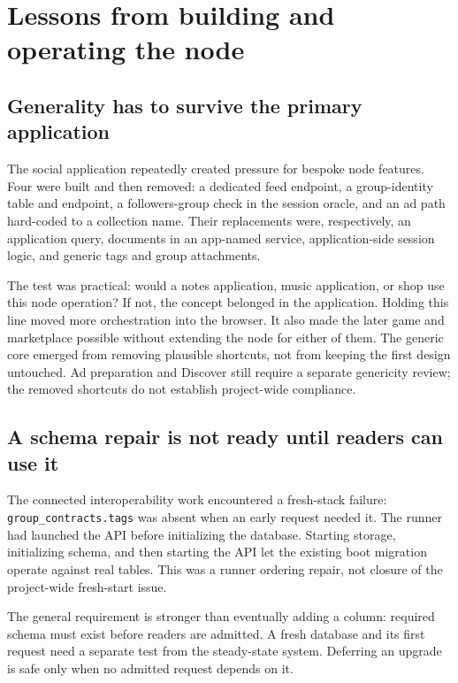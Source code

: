 \documentclass[sigconf, nonacm]{acmart}
\begin{document}
\section{Lessons from building and operating the node}
\label{sec:lessons}

\subsection{Generality has to survive the primary application}

The social application repeatedly created pressure for bespoke node
features. Four were built and then removed: a dedicated feed endpoint,
a group-identity table and endpoint, a followers-group check in the
session oracle, and an ad path hard-coded to a collection name. Their
replacements were, respectively, an application query, documents in an
app-named service, application-side session logic, and generic tags and
group attachments.

The test was practical: would a notes application, music application,
or shop use this node operation? If not, the concept belonged in the
application. Holding this line moved more orchestration into the browser.
It also made the later game and marketplace possible without extending
the node for either of them. The generic core emerged from removing
plausible shortcuts, not from keeping the first design untouched.
Ad preparation and Discover still require a separate genericity review;
the removed shortcuts do not establish project-wide compliance.

\subsection{A schema repair is not ready until readers can use it}

The connected interoperability work encountered a fresh-stack failure:
\texttt{group\_contracts.tags} was absent when an early request needed
it. The runner had launched the API before initializing the database.
Starting storage, initializing schema, and then starting the API let the
existing boot migration operate against real tables. This was a runner
ordering repair, not closure of the project-wide fresh-start issue.

The general requirement is stronger than eventually adding a column:
required schema must exist before readers are admitted. A fresh database
and its first request need a separate test from the steady-state system.
Deferring an upgrade is safe only when no admitted request depends on it.
\end{document}
